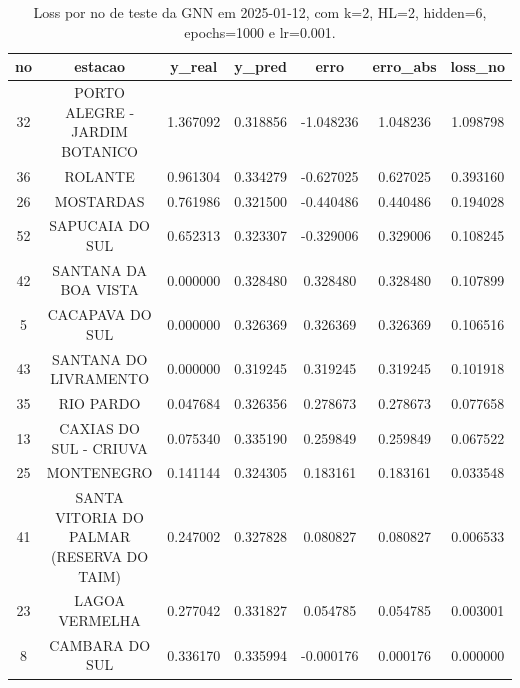 \begin{table}[h]
\centering
\caption{Loss por no de teste da GNN em 2025-01-12, com k=2, HL=2, hidden=6, epochs=1000 e lr=0.001.}
\label{tab:gnn_loss_k2_hl2_h6_e1000_d20250112}
\begin{tabular}{ccccccc}
\toprule
no & estacao & y\_real & y\_pred & erro & erro\_abs & loss\_no \\
\midrule
32 & PORTO ALEGRE - JARDIM BOTANICO & 1.367092 & 0.318856 & -1.048236 & 1.048236 & 1.098798 \\
36 & ROLANTE & 0.961304 & 0.334279 & -0.627025 & 0.627025 & 0.393160 \\
26 & MOSTARDAS & 0.761986 & 0.321500 & -0.440486 & 0.440486 & 0.194028 \\
52 & SAPUCAIA DO SUL & 0.652313 & 0.323307 & -0.329006 & 0.329006 & 0.108245 \\
42 & SANTANA DA BOA VISTA & 0.000000 & 0.328480 & 0.328480 & 0.328480 & 0.107899 \\
5 & CACAPAVA DO SUL & 0.000000 & 0.326369 & 0.326369 & 0.326369 & 0.106516 \\
43 & SANTANA DO LIVRAMENTO & 0.000000 & 0.319245 & 0.319245 & 0.319245 & 0.101918 \\
35 & RIO PARDO & 0.047684 & 0.326356 & 0.278673 & 0.278673 & 0.077658 \\
13 & CAXIAS DO SUL - CRIUVA & 0.075340 & 0.335190 & 0.259849 & 0.259849 & 0.067522 \\
25 & MONTENEGRO & 0.141144 & 0.324305 & 0.183161 & 0.183161 & 0.033548 \\
41 & SANTA VITORIA DO PALMAR (RESERVA DO TAIM) & 0.247002 & 0.327828 & 0.080827 & 0.080827 & 0.006533 \\
23 & LAGOA VERMELHA & 0.277042 & 0.331827 & 0.054785 & 0.054785 & 0.003001 \\
8 & CAMBARA DO SUL & 0.336170 & 0.335994 & -0.000176 & 0.000176 & 0.000000 \\
\bottomrule
\end{tabular}
\end{table}
